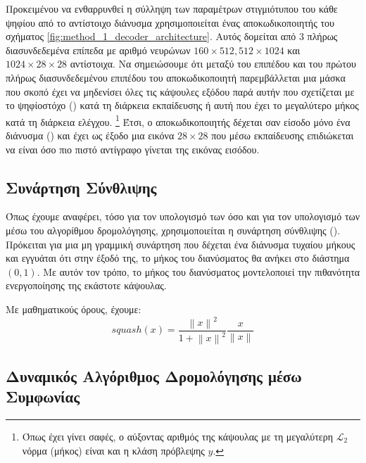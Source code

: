 Προκειμένου να ενθαρρυνθεί η σύλληψη των παραμέτρων στιγμιότυπου του κάθε ψηφίου από το αντίστοιχο διάνυσμα  χρησιμοποιείται ένας αποκωδικοποιητής του σχήματος \ref{fig:method_1_decoder_architecture}. Αυτός δομείται από 3 πλήρως διασυνδεδεμένα επίπεδα με αριθμό νευρώνων $160 \times 512, 512\times 1024$ και $ 1024 \times 28 \times 28 $ αντίστοιχα. Να σημειώσουμε ότι μεταξύ του επιπέδου  και του πρώτου πλήρως διασυνδεδεμένου επιπέδου του αποκωδικοποιητή παρεμβάλλεται μια μάσκα που σκοπό έχει να μηδενίσει όλες τις κάψουλες εξόδου παρά αυτήν που σχετίζεται με το ψηφίο\textendash στόχο () κατά τη διάρκεια εκπαίδευσης ή αυτή που έχει το μεγαλύτερο μήκος κατά τη διάρκεια ελέγχου. \footnote{Όπως έχει γίνει σαφές, ο αύξοντας αριθμός της κάψουλας με τη μεγαλύτερη $\mathcal{L}_2$ νόρμα (μήκος) είναι και η κλάση πρόβλεψης $\hat{y}$.} Έτσι, ο αποκωδικοποιητής δέχεται σαν είσοδο μόνο ένα διάνυσμα () και έχει ως έξοδο μια εικόνα $28 \times 28$ που μέσω εκπαίδευσης επιδιώκεται να είναι όσο πιο πιστό αντίγραφο γίνεται της εικόνας εισόδου.\par

\subsection{Συνάρτηση Σύνθλιψης}

Όπως έχουμε αναφέρει, τόσο για τον υπολογισμό των  όσο και για τον υπολογισμό των  μέσω του αλγορίθμου δρομολόγησης, χρησιμοποιείται η συνάρτηση σύνθλιψης (). Πρόκειται για μια μη γραμμική συνάρτηση που δέχεται ένα διάνυσμα τυχαίου μήκους και εγγυάται ότι στην έξοδό της, το μήκος του διανύσματος θα ανήκει στο διάστημα $(0,1)$. Με αυτόν τον τρόπο, το μήκος του διανύσματος μοντελοποιεί την πιθανότητα ενεργοποίησης της εκάστοτε κάψουλας.\par

Με μαθηματικούς όρους, έχουμε:
\begin{equation}
    squash(x) = \frac{\left\lVert x\right\rVert^2}{1+\left\lVert x\right\rVert^2} \frac{x}{\left\lVert x\right\rVert}
\end{equation}

\subsection{Δυναμικός Αλγόριθμος Δρομολόγησης μέσω Συμφωνίας}


